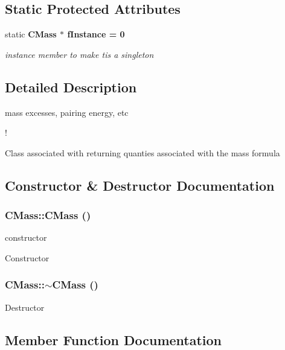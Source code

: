 \subsection*{Static Protected Attributes}
\begin{CompactItemize}
\item 
static \bf{CMass} $\ast$ \bf{f\-Instance} = 0\label{classCMass_a92566988e892bcfc9a17bb20e55f32c}

\begin{CompactList}\small\item\em instance member to make tis a singleton \item\end{CompactList}\end{CompactItemize}


\subsection{Detailed Description}
mass excesses, pairing energy, etc 

!

Class associated with returning quanties associated with the mass formula 



\subsection{Constructor \& Destructor Documentation}
\subsubsection{\setlength{\rightskip}{0pt plus 5cm}CMass::CMass ()\hspace{0.3cm}{\tt  [protected]}}\label{classCMass_2961afaaf4f193c19108d67a589072f3}


constructor 

Constructor 
\subsubsection{\setlength{\rightskip}{0pt plus 5cm}CMass::$\sim$CMass ()}\label{classCMass_ea23d00a8bcab0fd04aae37739509df0}


Destructor 

\subsection{Member Function Documentation}
